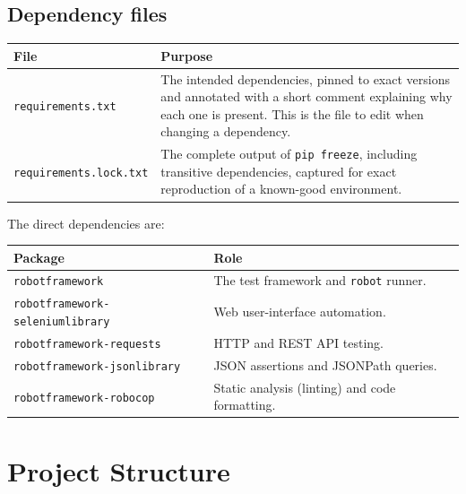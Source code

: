 \documentclass[a4paper,12pt]{article}
\newcommand{\code}[1]{\texttt{#1}}
\begin{document}
\subsection{Dependency files}

\begin{longtable}{p{} p{}}
\hline
\textbf{File} & \textbf{Purpose} \\
\hline
\endhead
\code{requirements.txt} &
  The intended dependencies, pinned to exact versions and annotated with a short
  comment explaining why each one is present. This is the file to edit when
  changing a dependency. \\
\code{requirements.lock.txt} &
  The complete output of \code{pip freeze}, including transitive dependencies,
  captured for exact reproduction of a known-good environment. \\
\hline
\end{longtable}

\noindent The direct dependencies are:

\begin{longtable}{p{} p{}}
\hline
\textbf{Package} & \textbf{Role} \\
\hline
\endhead
\code{robotframework} & The test framework and \code{robot} runner. \\
\code{robotframework-seleniumlibrary} & Web user-interface automation. \\
\code{robotframework-requests} & HTTP and REST API testing. \\
\code{robotframework-jsonlibrary} & JSON assertions and JSONPath queries. \\
\code{robotframework-robocop} & Static analysis (linting) and code formatting. \\
\hline
\end{longtable}

\section{Project Structure}
\end{document}
